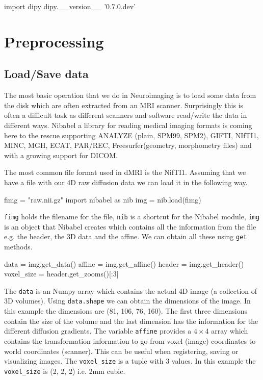\documentclass{bioinfo}
\begin{document}
\begin{python}
import dipy
dipy.__version__
'0.7.0.dev'
\end{python}

\section{Preprocessing}

\subsection{Load/Save data}
The most basic operation that we do in Neuroimaging is to load some data from the disk which are often extracted from an MRI scanner. Surprisingly this is often a difficult task as different scanners and software read/write the data in different ways. Nibabel a library for reading medical imaging formats is coming here to the rescue supporting ANALYZE (plain, SPM99, SPM2), GIFTI, NIfTI1, MINC, MGH, ECAT, PAR/REC, Freesurfer(geometry, morphometry files) and with a growing support for DICOM. 

The most common file format used in dMRI is the NifTI1. Assuming that we have a file with our 4D raw diffusion data we can load it in the following way.
\begin{python}
fimg = "raw.nii.gz"
import nibabel as nib
img = nib.load(fimg)
\end{python}
\texttt{fimg} holds the filename for the file, \texttt{nib} is a shortcut for the Nibabel module, \texttt{img} is an object that Nibabel creates which contains all the information from the file e.g. the header, the 3D data and the affine. We can obtain all these using \texttt{get} methods.
\begin{python}
data = img.get_data()
affine = img.get_affine()
header = img.get_header()
voxel_size = header.get_zooms()[:3]
\end{python}
The \texttt{data} is an Numpy array which contains the actual 4D image (a collection of 3D volumes). Using \texttt{data.shape} we can obtain the dimensions of the image. In this example the dimensions are (81, 106, 76, 160). The first three dimensions contain the size of the volume and the last dimension has the information for the different diffusion gradients. The variable \texttt{affine} provides a $4\times4$ array which contains the transformation information to go from voxel (image) coordinates to world coordinates (scanner). This can be useful when registering, saving or visualizing images. The \texttt{voxel\_size} is a tuple with 3 values. In this example the \texttt{voxel\_size} is (2, 2, 2) i.e. 2mm cubic.
\end{document}
